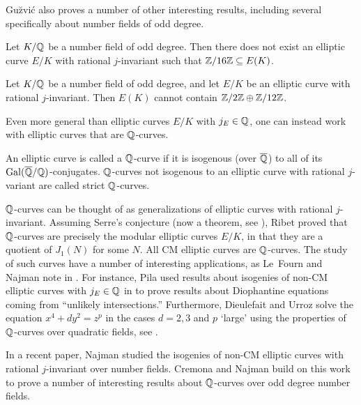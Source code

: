  Gu{\u{z}}vi\'c also proves a number of other interesting results, including several specifically about number fields of odd degree.
 
 
 \begin{lem}
 Let $K/\mathbb{Q}$ be a number field of odd degree. Then there does not exist an elliptic curve $E/K$ with rational $j$-invariant such that $\mathbb{Z}/16\mathbb{Z} \subseteq E(K)$. 
 \end{lem}


 \begin{lem}
 Let $K/\mathbb{Q}$ be a number field of odd degree, and let $E/K$ be an elliptic curve with rational $j$-invariant. Then $E(K)$ cannot contain $\mathbb{Z}/2\mathbb{Z} \oplus \mathbb{Z}/12\mathbb{Z}$. 
 \end{lem}


Even more general than elliptic curves $E/K$ with $j_E \in \mathbb{Q}$, one can instead work with elliptic curves that are $\mathbb{Q}$-curves. 


\begin{dfn}
An elliptic curve is called a $\mathbb{Q}$-curve if it is isogenous (over $\overline{\mathbb{Q}}$) to all of its $\operatorname{Gal}(\overline{\mathbb{Q}}/\mathbb{Q})$-conjugates. $\mathbb{Q}$-curves not isogenous to an elliptic curve with rational $j$-variant are called strict $\mathbb{Q}$-curves. 
\end{dfn}


$\mathbb{Q}$-curves can be thought of as generalizations of elliptic curves with rational $j$-invariant. Assuming Serre's conjecture (now a theorem, see \cite{kharewintenberger1,kharewintenberger2}), Ribet proved that $\mathbb{Q}$-curves are precisely the modular elliptic curves $E/K$, in that they are a quotient of $J_1(N)$ for some $N$. All CM elliptic curves are $\mathbb{Q}$-curves. The study of such curves have a number of interesting applications, as Le~Fourn and Najman note in \cite{lefournnajman20}. For instance, Pila used results about isogenies of non-CM elliptic curves with $j_E \in \mathbb{Q}$ in \cite{pila17} to prove results about Diophantine equations coming from ``unlikely intersections.'' Furthermore, Dieulefait and Urroz solve the equation $x^4 + dy^2= z^p$ in the cases $d= 2, 3$ and $p$ `large' using the properties of $\mathbb{Q}$-curves over quadratic fields, see \cite{dieulefaiturroz09}.

 
In a recent paper, Najman studied the isogenies of non-CM elliptic curves with rational $j$-invariant over number fields. Cremona and Najman build on this work to prove a number of interesting results about $\mathbb{Q}$-curves over odd degree number fields. 


